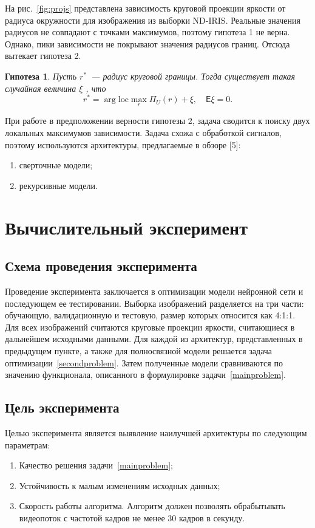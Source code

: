 \documentclass[12pt, twoside]{article}
\newtheorem{hop}{Гипотеза}
\begin{document}
На рис.~\ref{fig:projs} представлена зависимость круговой проекции яркости от радиуса окружности для изображения из выборки ND-IRIS. Реальные значения радиусов не совпадают с точками максимумов, поэтому гипотеза 1 не верна. Однако, пики зависимости не покрывают значения радиусов границ. Отсюда вытекает гипотеза 2.

\begin{hop}
Пусть $r^*$~--- радиус круговой границы. Тогда существует такая случайная величина $\xi$ , что
\[
 r^* = \arg \text{loc}\max\limits_{r}\Pi_U(r) + \xi, \quad \mathsf{E}\xi=0.
\]
\end{hop}

При работе в предположении верности гипотезы 2, задача сводится к поиску двух локальных максимумов зависимости. Задача схожа с обработкой сигналов, поэтому используются архитектуры, предлагаемые в обзоре [5]:
\begin{enumerate}
	\item сверточные модели;
	\item рекурсивные модели.
\end{enumerate}


\section{Вычислительный эксперимент}

\subsection{Схема проведения эксперимента}

Проведение эксперимента заключается в оптимизации модели нейронной сети и последующем ее тестировании. Выборка изображений разделяется на три части: обучающую, валидационную и тестовую, размер которых относится как 4:1:1. Для всех изображений считаются круговые проекции яркости, считающиеся в дальнейшем исходными данными. Для каждой из архитектур, представленных в предыдущем пункте, а также для полносвязной модели решается задача оптимизации~\eqref{secondproblem}. Затем полученные модели сравниваются по значению функционала, описанного в формулировке задачи~\eqref{mainproblem}.

\subsection{Цель эксперимента}

Целью эксперимента является выявление наилучшей архитектуры по следующим параметрам:
\begin{enumerate}
	\item Качество решения задачи~\eqref{mainproblem};
	\item Устойчивость к малым изменениям исходных данных;
	\item Скорость работы алгоритма. Алгоритм должен позволять обрабытывать видеопоток с частотой кадров не менее 30 кадров в секунду.
\end{enumerate}
\end{document}
